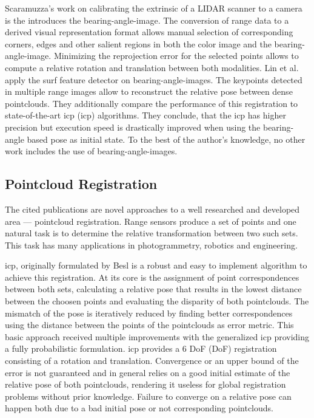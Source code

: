 Scaramuzza's\cite{scaramuzza_iros2007} work on calibrating the extrinsic of a \acrshort{LIDAR} scanner to a camera is the introduces the \gls{bearing-angle-image}.
The conversion of range data to a derived visual representation format allows manual selection of corresponding corners, edges and other salient regions in both the color image and the \gls{bearing-angle-image}.
Minimizing the reprojection error for the selected points allows to compute a relative rotation and translation between both modalities.
Lin et al.\cite{lin_easp2017} apply the \acrshort{surf}\cite{bay_eccv06} feature detector on \glspl{bearing-angle-image}.
The keypoints detected in multiple range images allow to reconstruct the relative pose between dense pointclouds.
They additionally compare the performance of this registration to state-of-the-art \acrshort{icp} (\acrlong{icp}) algorithms.
They conclude, that the \acrshort{icp} has higher precision but execution speed is drastically improved when using the \gls{bearing-angle} based pose as initial state.
To the best of the author's knowledge, no other work includes the use of \glspl{bearing-angle-image}.

\subsection{Pointcloud Registration}

The cited publications are novel approaches to a well researched and developed area --- pointcloud registration.
Range sensors produce a set of points and one natural task is to determine the relative transformation between two such sets.
This task has many applications in photogrammetry, robotics and engineering.

\acrshort{icp}, originally formulated by Besl\cite{besl_pami1992} is a robust and easy to implement algorithm to achieve this registration.
At its core is the assignment of point correspondences between both sets, calculating a relative pose that results in the lowest distance between the choosen points and evaluating the disparity of both pointclouds.
The mismatch of the pose is iteratively reduced by finding better correspondences using the distance between the points of the pointclouds as error metric.
This basic approach received multiple improvements with the generalized \acrshort{icp}\cite{segal_2009,korn_2014} providing a fully probabilistic formulation.
\acrshort{icp} provides a 6 \acrlong{DoF} (\acrshort{DoF}) registration consisting of a rotation and translation.
Convergence or an upper bound of the error is not guaranteed and in general relies on a good initial estimate of the relative pose of both pointclouds, rendering it useless for global registration problems without prior knowledge.
Failure to converge on a relative pose can happen both due to a bad initial pose or not corresponding pointclouds.

